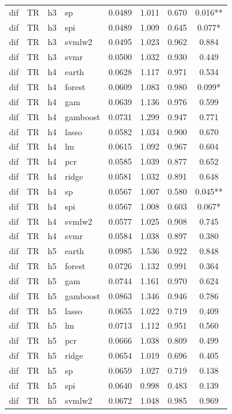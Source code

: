 \begin{ThreePartTable}
\begin{longtable}[t]{llclcccc}
dif & TR & h3 & sp & 0.0489 & 1.011 & 0.670 & 0.016**\\
dif & TR & h3 & spi & 0.0489 & 1.009 & 0.645 & 0.077*\\
dif & TR & h3 & svmlw2 & 0.0495 & 1.023 & 0.962 & 0.884\\
dif & TR & h3 & svmr & 0.0500 & 1.032 & 0.930 & 0.449\\
\addlinespace
dif & TR & h4 & earth & 0.0628 & 1.117 & 0.971 & 0.534\\
dif & TR & h4 & forest & 0.0609 & 1.083 & 0.980 & 0.099*\\
dif & TR & h4 & gam & 0.0639 & 1.136 & 0.976 & 0.599\\
dif & TR & h4 & gamboost & 0.0731 & 1.299 & 0.947 & 0.771\\
dif & TR & h4 & lasso & 0.0582 & 1.034 & 0.900 & 0.670\\
dif & TR & h4 & lm & 0.0615 & 1.092 & 0.967 & 0.604\\
dif & TR & h4 & pcr & 0.0585 & 1.039 & 0.877 & 0.652\\
dif & TR & h4 & ridge & 0.0581 & 1.032 & 0.891 & 0.648\\
dif & TR & h4 & sp & 0.0567 & 1.007 & 0.580 & 0.045**\\
dif & TR & h4 & spi & 0.0567 & 1.008 & 0.603 & 0.067*\\
dif & TR & h4 & svmlw2 & 0.0577 & 1.025 & 0.908 & 0.745\\
dif & TR & h4 & svmr & 0.0584 & 1.038 & 0.897 & 0.380\\
\addlinespace
dif & TR & h5 & earth & 0.0985 & 1.536 & 0.922 & 0.848\\
dif & TR & h5 & forest & 0.0726 & 1.132 & 0.991 & 0.364\\
dif & TR & h5 & gam & 0.0744 & 1.161 & 0.970 & 0.624\\
dif & TR & h5 & gamboost & 0.0863 & 1.346 & 0.946 & 0.786\\
dif & TR & h5 & lasso & 0.0655 & 1.022 & 0.719 & 0.409\\
dif & TR & h5 & lm & 0.0713 & 1.112 & 0.951 & 0.560\\
dif & TR & h5 & pcr & 0.0666 & 1.038 & 0.809 & 0.499\\
dif & TR & h5 & ridge & 0.0654 & 1.019 & 0.696 & 0.405\\
dif & TR & h5 & sp & 0.0659 & 1.027 & 0.719 & 0.138\\
dif & TR & h5 & spi & 0.0640 & 0.998 & 0.483 & 0.139\\
dif & TR & h5 & svmlw2 & 0.0672 & 1.048 & 0.985 & 0.969\\

\end{longtable}
\end{ThreePartTable}
